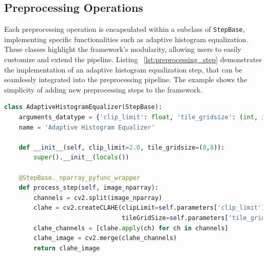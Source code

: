 \documentclass[journal]{new-aiaa}
\begin{document}



\subsection{Preprocessing Operations}
Each preprocessing operation is encapsulated within a subclass of \texttt{StepBase}, implementing specific functionalities such as adaptive histogram equalization. These classes highlight the framework's modularity, allowing users to easily customize and extend the pipeline. Listing ~\ref{lst:preprocessing_step} demonstrates the implementation of an adaptive histogram equalization step, that can be seamlessly integrated into the preprocessing pipeline. The example shows the simplicity of adding new preprocessing steps to the framework.\\

\begin{lstlisting}[language=Python, caption=Example of a Preprocessing Step Implementation, label=lst:preprocessing_step]
class AdaptiveHistogramEqualizer(StepBase):
    arguments_datatype = {'clip_limit': float, 'tile_gridsize': (int, int)}
    name = 'Adaptive Histogram Equalizer'

    def __init__(self, clip_limit=2.0, tile_gridsize=(8,8)):
        super().__init__(locals())

    @StepBase._nparray_pyfunc_wrapper
    def process_step(self, image_nparray):
        channels = cv2.split(image_nparray)
        clahe = cv2.createCLAHE(clipLimit=self.parameters['clip_limit'],
                                tileGridSize=self.parameters['tile_gridsize'])
        clahe_channels = [clahe.apply(ch) for ch in channels]
        clahe_image = cv2.merge(clahe_channels)
        return clahe_image
\end{lstlisting}
\end{document}
